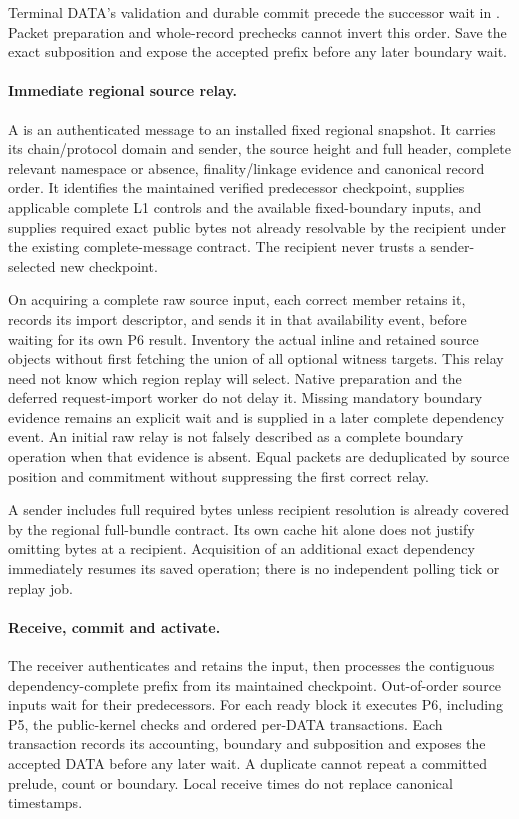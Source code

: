 Terminal DATA's validation and durable commit precede the successor
wait in . Packet preparation and whole-record
prechecks cannot invert this order. Save the exact subposition and
expose the accepted prefix before any later boundary wait.

\paragraph{Immediate regional source relay.}
A  is an authenticated message to an installed fixed
regional snapshot. It carries its chain/protocol domain and sender,
the source height and full header, complete relevant namespace or
absence, finality/linkage evidence and canonical record order. It
identifies the maintained verified predecessor checkpoint, supplies
applicable complete L1 controls and the available fixed-boundary
inputs, and supplies required exact public bytes not already resolvable
by the recipient under the existing complete-message contract. The
recipient never trusts a sender-selected new checkpoint.

On acquiring a complete raw source input, each correct member retains it, records its import
descriptor, and sends it in that availability event, before waiting for its own P6
result. Inventory the actual inline and retained source objects without
first fetching the union of all optional witness targets. This relay
need not know which region replay will select. Native preparation and the deferred request-import worker do
not delay it. Missing mandatory boundary evidence remains an explicit
wait and is supplied in a later complete dependency event. An initial
raw relay is not falsely described as a complete boundary operation
when that evidence is absent. Equal packets are deduplicated by source
position and commitment without suppressing the first correct relay.

A sender includes full required bytes unless recipient resolution is
already covered by the regional full-bundle contract. Its own cache hit
alone does not justify omitting bytes at a recipient. Acquisition of an
additional exact dependency immediately resumes its saved operation;
there is no independent polling tick or replay job.

\paragraph{Receive, commit and activate.}
The receiver authenticates and retains the input, then processes the
contiguous dependency-complete prefix from its maintained checkpoint.
Out-of-order source inputs wait for their predecessors. For each ready
block it executes P6, including P5, the public-kernel checks and ordered
per-DATA transactions. Each transaction records its accounting,
boundary and subposition and exposes the accepted DATA before any
later wait. A duplicate cannot repeat a committed prelude, count or
boundary. Local receive times do not replace canonical timestamps.

